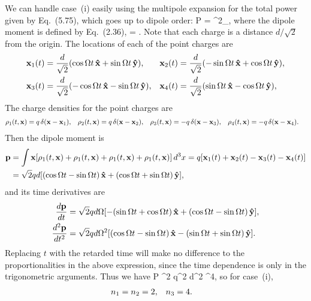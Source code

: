 \begin{solution}
	We can handle case~(i) easily using the multipole expansion for the total power given by Eq.~(5.75), which goes up to dipole order:
	\beq
		P =  ^2_\ret,
	\eeq
	where the dipole moment is defined by Eq.~(2.36),
	\beq
		\vp = \int \vx \rho \dcx.
	\eeq
	Note that each charge is a distance $d / \sqrt{2}$ from the origin.  The locations of each of the point charges are
	\begin{align}
		\vb{x}_1(t) &= \frac{d}{\sqrt{2}} (\cos \Omega t \,\vb{\hat{x}} + \sin \Omega t \,\vb{\hat{y}}), &
		\vb{x}_2(t) &= \frac{d}{\sqrt{2}} (-\sin \Omega t \,\vb{\hat{x}} + \cos \Omega t \,\vb{\hat{y}}), \notag \\
		\vb{x}_3(t) &= \frac{d}{\sqrt{2}} (-\cos \Omega t \,\vb{\hat{x}} - \sin \Omega t \,\vb{\hat{y}}), &
		\vb{x}_4(t) &= \frac{d}{\sqrt{2}} (\sin \Omega t \,\vb{\hat{x}} - \cos \Omega t \,\vb{\hat{y}}), \label{locs}
	\end{align}
	The charge densities for the point charges are
	\begin{align*}
		\rho_1(t, \vb{x}) &= q \, \delta(\vb{x} - \vb{x}_1), &
		\rho_2(t, \vb{x}) &= q \, \delta(\vb{x} - \vb{x}_2), &
		\rho_3(t, \vb{x}) &= -q \, \delta(\vb{x} - \vb{x}_3), &
		\rho_4(t, \vb{x}) &= -q \, \delta(\vb{x} - \vb{x}_4).
	\end{align*}
	Then the dipole moment is
	\begin{align*}
		\vb{p} &= \int \vb{x} [ \rho_1(t, \vb{x}) + \rho_1(t, \vb{x}) + \rho_1(t, \vb{x}) + \rho_1(t, \vb{x}) ] \dd[3]{x}
		= q [ \vb{x}_1(t) + \vb{x}_2(t) - \vb{x}_3(t) - \vb{x}_4(t) ] \\
		&= \sqrt{2} q d [ (\cos \Omega t - \sin \Omega t) \,\vb{\hat{x}} + (\cos \Omega t + \sin \Omega t) \,\vb{\hat{y}} ],
	\end{align*}
	and its time derivatives are
	\begin{align*}
		\dv{\vb{p}}{t} &= \sqrt{2} q d \Omega [ -(\sin \Omega t + \cos \Omega t) \,\vb{\hat{x}} + (\cos \Omega t - \sin \Omega t) \,\vb{\hat{y}} ], \\
		\dv[2]{\vb{p}}{t} &= \sqrt{2} q d \Omega^2 [ (\cos \Omega t - \sin \Omega t) \,\vb{\hat{x}} - (\sin \Omega t + \sin \Omega t) \,\vb{\hat{y}} ].
	\end{align*}
	Replacing $t$ with the retarded time will make no difference to the proportionalities in the above expression, since the time dependence is only in the trigonometric arguments.  Thus we have
	\beq
		P \propto {}^2
		\propto q^2 d^2 \Omg^4,
	\eeq
	so for case~(i),
	\begin{align*}
		{n_1} &= {n_2} = 2, &
		{n_3} &= 4.
	\end{align*}
	

\end{solution}
